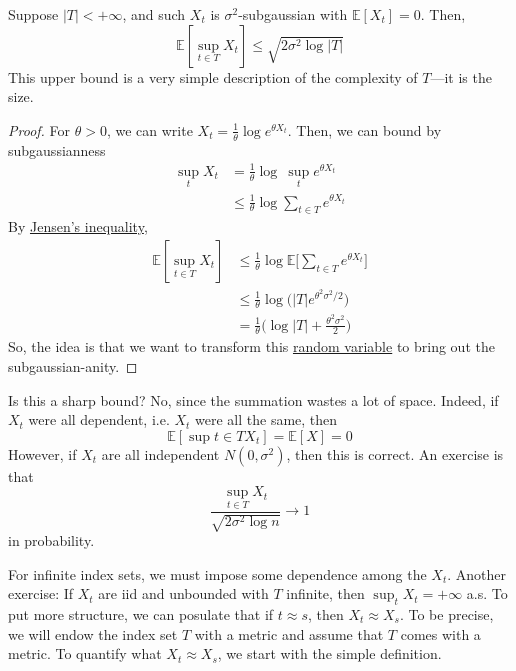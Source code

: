 \begin{theorem}
  \label{thm:maximal-inequality-for-finitely-many}
	Suppose $|T| < +\infty$, and such $X_t$ is $\sigma^2$-subgaussian with $\mathbb{E}[X_t] = 0$. Then, 
	\begin{equation}
		\mathbb{E}[\sup_{t \in T} X_t] \leq \sqrt{2 \sigma^2 \log{|T|}}
	\end{equation}
	This upper bound is a very simple description of the complexity of $T$---it is the size. 
\end{theorem}
\begin{proof}
	For $\theta > 0$, we can write $X_t = \frac{1}{\theta} \log{e^{\theta X_t}}$. Then, we can bound by subgaussianness
	\begin{align}
		\sup_{t} X_t & = \frac{1}{\theta} \log{\ \sup_{t} e^{\theta X_t}} \\ 
								 & \leq \frac{1}{\theta} \log \sum_{t \in T} e^{\theta X_t}
	\end{align} 
	By \hyperref[prob-thm:jensens-inequality]{Jensen's inequality}, 
	\begin{align}
		\mathbb{E}[\sup_{t \in T} X_t] & \leq \frac{1}{\theta} \log \mathbb{E} \bigg[ \sum_{t \in T} e^{\theta X_t} \bigg] \\ 
																	 & \leq \frac{1}{\theta} \log \big( |T| e^{\theta^2 \sigma^2 /2} \big) \\ 
																	 & = \frac{1}{\theta} \big( \log{|T|} + \frac{\theta^2 \sigma^2}{2} \big)
	\end{align}
	So, the idea is that we want to transform this \hyperref[prob-def:random-variable]{random variable} to bring out the subgaussian-anity. 
\end{proof}

Is this a sharp bound? No, since the summation wastes a lot of space. Indeed, if $X_t$ were all dependent, i.e. $X_t$ were all the same, then 
\begin{equation}
	\mathbb{E}[\sup{t \in T} X_t] = \mathbb{E}[X] = 0
\end{equation}
However, if $X_t$ are all independent $N(0, \sigma^2)$, then this is correct. An exercise is that \begin{equation}
	\frac{\sup_{t \in T} X_t}{\sqrt{2 \sigma^2 \log{n}}} \to 1
\end{equation}
in probability. 

For infinite index sets, we must impose some dependence among the $X_t$. Another exercise: If $X_t$ are iid and unbounded with $T$ infinite, then $\sup_{t} X_t = +\infty$ a.s. To put more structure, we can posulate that if $t \approx s$, then $X_t \approx X_s$. To be precise, we will endow the index set $T$ with a metric and assume that $T$ comes with a metric. To quantify what $X_t \approx X_s$, we start with the simple definition. 

